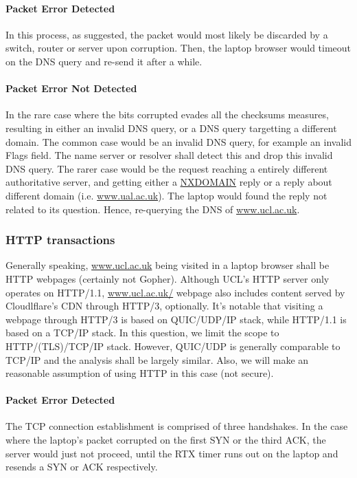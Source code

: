 \documentclass[12pt]{article}
\begin{document}
\paragraph{Packet Error Detected}

In this process, as suggested, the packet would most likely be discarded by a switch, router or server upon corruption. Then, the laptop browser would timeout on the DNS query and re-send it after a while. 

\paragraph{Packet Error Not Detected}

In the rare case where the bits corrupted evades all the checksums measures, resulting in either an invalid DNS query, or a DNS query targetting a different domain. The common case would be an invalid DNS query, for example an invalid Flags field. The name server or resolver shall detect this and drop this invalid DNS query. The rarer case would be the request reaching a entirely different authoritative server, and getting either a \url{NXDOMAIN} reply or a reply about different domain (i.e. \url{www.ual.ac.uk}). The laptop would found the reply not related to its question. Hence, re-querying the DNS of \url{www.ucl.ac.uk}.

\subsubsection{HTTP transactions}

Generally speaking, \url{www.ucl.ac.uk} being visited in a laptop browser shall be HTTP webpages (certainly not Gopher). Although UCL's HTTP server only operates on HTTP/1.1, \url{www.ucl.ac.uk/} webpage also includes content served by Cloudlflare's CDN through HTTP/3, optionally. It's notable that visiting a webpage through HTTP/3 is based on QUIC/UDP/IP stack, while HTTP/1.1 is based on a TCP/IP stack. In this question, we limit the scope to HTTP/(TLS)/TCP/IP stack. However, QUIC/UDP is generally comparable to TCP/IP and the analysis shall be largely similar. Also, we will make an reasonable assumption of using HTTP in this case (not secure).

\paragraph{Packet Error Detected}

The TCP connection establishment is comprised of three handshakes. In the case where the laptop's packet corrupted on the first SYN or the third ACK, the server would just not proceed, until the RTX timer runs out on the laptop and resends a SYN or ACK respectively.
\end{document}
